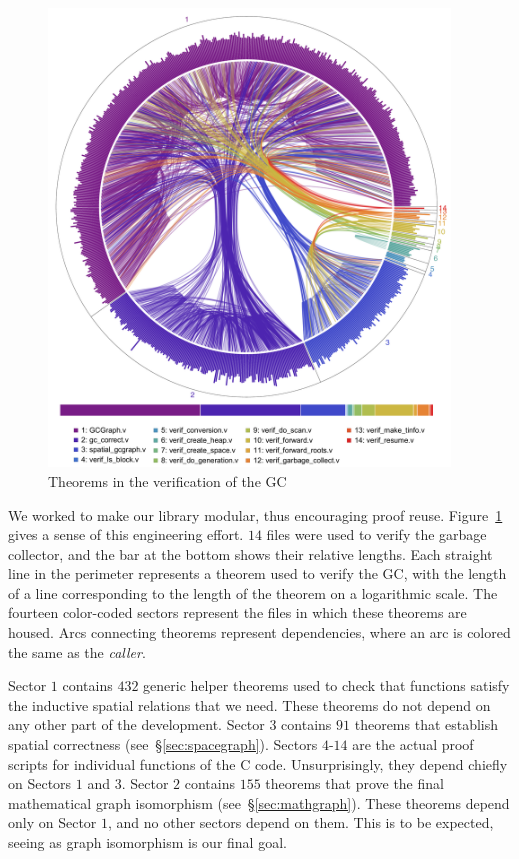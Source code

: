 \begin{figure}
\includegraphics[width=0.95\textwidth]{certigc_theorems}
\caption{Theorems in the verification of the GC}
\label{fig:connectedness}
\end{figure}

We worked to make our library modular, thus encouraging 
proof reuse. Figure~\ref{fig:connectedness} gives a sense of this 
engineering effort.
$14$ files were used to verify the garbage collector, and
the bar at the bottom shows their relative lengths.
Each straight line in the perimeter represents a theorem used to verify the GC, 
with the length of a line corresponding to the length of the theorem on a 
logarithmic scale. The fourteen color-coded sectors represent the files in which 
these theorems are housed. Arcs connecting theorems represent dependencies, 
where an arc is colored the same as the \emph{caller}.

Sector $1$ contains $432$ generic helper theorems used to check that functions
satisfy the inductive spatial relations that we need. These theorems do not depend
on any other part of the development. Sector $3$ contains $91$ theorems that establish  
spatial correctness (see~\S\ref{sec:spacegraph}). Sectors $4$-$14$ are the actual
proof scripts for individual functions of the C code. Unsurprisingly, they depend
chiefly on Sectors $1$ and $3$. Sector $2$ contains $155$ theorems that 
prove the final mathematical graph isomorphism (see~\S\ref{sec:mathgraph}).
These theorems depend only on Sector $1$, 
and no other sectors depend on them. This is to be expected, seeing as graph
isomorphism is our final goal.

